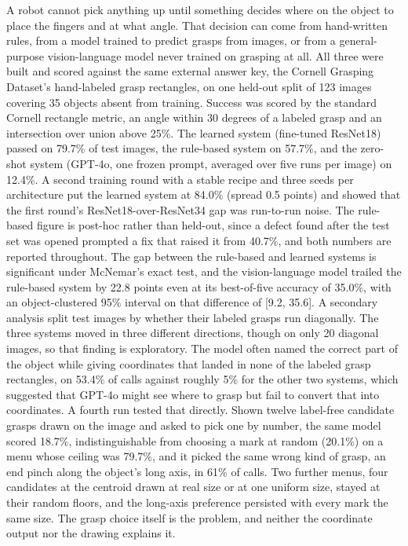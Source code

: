 \documentclass[12pt,letterpaper]{article}
\begin{document}
A robot cannot pick anything up until something decides where on the
object to place the fingers and at what angle. That decision can come
from hand-written rules, from a model trained to predict grasps from
images, or from a general-purpose vision-language model never trained
on grasping at all. All three were built and scored against the same
external answer key, the Cornell Grasping Dataset's hand-labeled grasp
rectangles, on one held-out split of 123 images covering 35 objects
absent from training. Success was scored by the standard Cornell
rectangle metric, an angle within 30 degrees of a labeled grasp and an
intersection over union above 25\%. The learned system (fine-tuned
ResNet18) passed on 79.7\% of test images, the rule-based system on
57.7\%, and the zero-shot system (GPT-4o, one frozen prompt, averaged
over five runs per image) on 12.4\%. A second training round with a
stable recipe and three seeds per architecture put the learned system
at 84.0\% (spread 0.5 points) and showed that the first round's
ResNet18-over-ResNet34 gap was run-to-run noise. The rule-based figure is post-hoc
rather than held-out, since a defect found after the test set was
opened prompted a fix that raised it from 40.7\%, and both numbers are
reported throughout. The gap between the rule-based and learned systems
is significant under McNemar's exact test, and the vision-language
model trailed the rule-based system by 22.8 points even at its
best-of-five accuracy of 35.0\%, with an object-clustered 95\% interval
on that difference of [9.2, 35.6]. A secondary
analysis split test images by whether their labeled grasps run
diagonally. The three systems moved in three different directions,
though on only 20 diagonal images, so that finding is exploratory. The
model often named the correct part of the object while giving
coordinates that landed in none of the labeled grasp rectangles, on
53.4\% of calls against roughly 5\% for the other two systems, which
suggested that GPT-4o might see where to grasp but fail to convert that
into coordinates. A fourth run tested that directly. Shown twelve
label-free candidate grasps drawn on the image and asked to pick one by
number, the same model scored 18.7\%, indistinguishable from choosing a
mark at random (20.1\%) on a menu whose ceiling was 79.7\%, and it
picked the same wrong kind of grasp, an end pinch along the object's
long axis, in 61\% of calls. Two further menus, four candidates at the
centroid drawn at real size or at one uniform size, stayed at their
random floors, and the long-axis preference persisted with every mark
the same size. The grasp choice itself is the problem, and neither the
coordinate output nor the drawing explains it.
\end{document}
